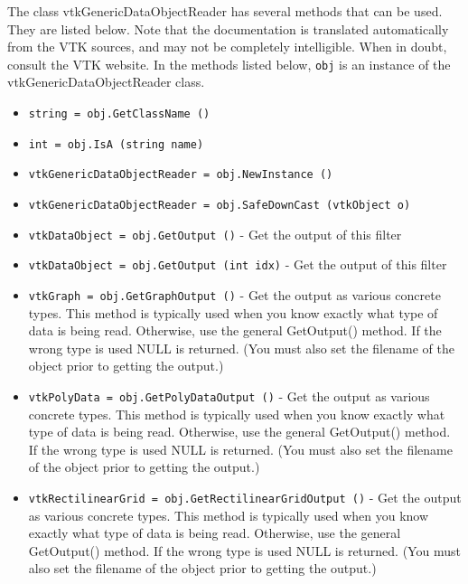 The class vtkGenericDataObjectReader has several methods that can be used.
  They are listed below.
Note that the documentation is translated automatically from the VTK sources,
and may not be completely intelligible.  When in doubt, consult the VTK website.
In the methods listed below, \verb|obj| is an instance of the vtkGenericDataObjectReader class.
\begin{itemize}
\item  \verb|string = obj.GetClassName ()|

\item  \verb|int = obj.IsA (string name)|

\item  \verb|vtkGenericDataObjectReader = obj.NewInstance ()|

\item  \verb|vtkGenericDataObjectReader = obj.SafeDownCast (vtkObject o)|

\item  \verb|vtkDataObject = obj.GetOutput ()| -  Get the output of this filter

\item  \verb|vtkDataObject = obj.GetOutput (int idx)| -  Get the output of this filter

\item  \verb|vtkGraph = obj.GetGraphOutput ()| -  Get the output as various concrete types. This method is typically used
 when you know exactly what type of data is being read.  Otherwise, use
 the general GetOutput() method. If the wrong type is used NULL is
 returned.  (You must also set the filename of the object prior to
 getting the output.)

\item  \verb|vtkPolyData = obj.GetPolyDataOutput ()| -  Get the output as various concrete types. This method is typically used
 when you know exactly what type of data is being read.  Otherwise, use
 the general GetOutput() method. If the wrong type is used NULL is
 returned.  (You must also set the filename of the object prior to
 getting the output.)

\item  \verb|vtkRectilinearGrid = obj.GetRectilinearGridOutput ()| -  Get the output as various concrete types. This method is typically used
 when you know exactly what type of data is being read.  Otherwise, use
 the general GetOutput() method. If the wrong type is used NULL is
 returned.  (You must also set the filename of the object prior to
 getting the output.)


\end{itemize}
